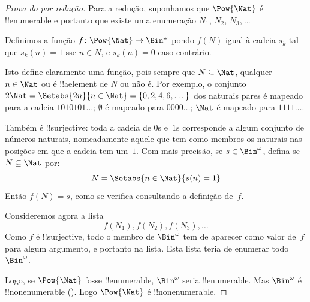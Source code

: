 \documentclass[../../../include/open-logic-section]{subfiles}
\begin{document}
\begin{proof}[Prova do {} por redução]
Para a redução, suponhamos que $\Pow{\Nat}$ é !!{enumerable} e portanto que existe
uma enumeração $N_{1}$, $N_{2}$, $N_{3}$, \dots

Definimos a função $f \colon \Pow{\Nat} \to \Bin^\omega$ pondo $f(N)$ igual à
cadeia $s_{k}$ tal que $s_{k}(n) = 1$ sse $n \in N$, e $s_k(n) = 0$ caso contrário.

Isto define claramente uma função, pois sempre que $N \subseteq \Nat$, qualquer
$n \in \Nat$ ou é !!a{element} de $N$ ou não é. Por exemplo, o conjunto
$2\Nat = \Setabs{2n}{n \in \Nat} = \{0,2, 4, 6, \dots\}$ dos naturais pares é
mapeado para a cadeia $1010101\dots$; $\emptyset$ é mapeado para $0000\dots$;
$\Nat$ é mapeado para $1111\dots$.

Também é !!{surjective}: toda a cadeia de $0$s e~$1$s corresponde a algum
conjunto de números naturais, nomeadamente aquele que tem como membros os naturais
nas posições em que a cadeia tem um~$1$. Com mais precisão, se $s \in \Bin^\omega$,
defina-se $N \subseteq \Nat$ por:
\[
N = \Setabs{n \in \Nat}{s(n) = 1}
\]
Então $f(N) = s$, como se verifica consultando a definição de~$f$.

Consideremos agora a lista
\[
f(N_1), f(N_2), f(N_3), \dots
\]
Como $f$ é !!{surjective}, todo o membro de $\Bin^\omega$ tem de aparecer como
valor de~$f$ para algum argumento, e portanto na lista. Esta lista teria de
enumerar todo~$\Bin^\omega$.

Logo, se $\Pow{\Nat}$ fosse !!{enumerable}, $\Bin^\omega$ seria !!{enumerable}.
Mas $\Bin^\omega$ é !!{nonenumerable} ().
Logo $\Pow{\Nat}$ é !!{nonenumerable}.
\end{proof}

\end{document}
